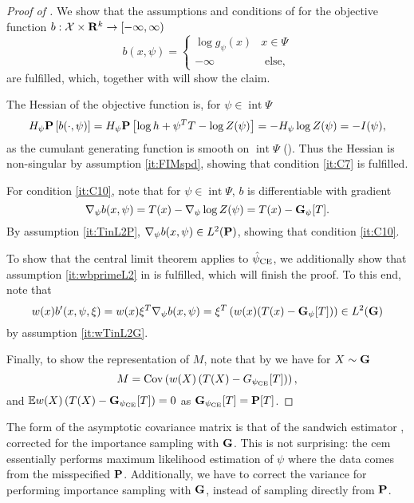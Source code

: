 \begin{proof}[Proof of ]
    We show that the assumptions and conditions of  for the objective function $b : \mathcal X \times \R^{k} \to [-\infty, \infty)$ 
    $$
        b(x,\psi) = \begin{cases}
            \log g_{\psi}(x) & x\in\Psi\\
            - \infty & \text{ else,}
        \end{cases}
    $$
    are fulfilled, which, together with  will show the claim. 

    The Hessian of the objective function is, for $\psi \in \operatorname{int} \Psi$
    $$
        H_{\psi} \P \left[ b(\cdot, \psi) \right] = H_{\psi} \P \left[ \log h + \psi^{T} T - \log Z(\psi) \right] = -H_{\psi}\log Z(\psi)  = - I(\psi),
    $$
    as the cumulant generating function is smooth on $ \operatorname{int} \Psi$ (). Thus the Hessian is non-singular by assumption \ref{it:FIMspd}, showing that condition \ref{it:C7} is fulfilled.

    For condition \ref{it:C10}, note that for $\psi \in \operatorname{int} \Psi$, $b$ is differentiable with gradient 
    $$
        \nabla_{\psi} b(x, \psi) = T(x) - \nabla_{\psi} \log Z(\psi) = T(x) - \G_{\psi} [T].
    $$
    By assumption \ref{it:TinL2P}, $\nabla_{\psi} b(x,\psi) \in L^{2} (\P)$, showing that condition \ref{it:C10}.

    To show that the central limit theorem applies to $\hpce$, we additionally show that assumption \ref{it:wbprimeL2} in  is fulfilled, which will finish the proof. To this end, note that 
    $$
        w(x)b'(x,\psi,\xi) = w(x) \xi^{T}\nabla_{\psi} b(x, \psi) = \xi^{T} \left( w(x) (T(x) - \G_{\psi}[T]) \right) \in L^{2} (\G)
    $$
    by assumption \ref{it:wTinL2G}.

    Finally, to show the representation of $M$, note that by  we have for $X \sim \G$
    $$
        M = \cov \left( w(X) \left( T(X) - G_{\pce}[T]\right)\right),
    $$
    and $\E w(X) \left( T(X) - \G_{\pce} [T] \right) = 0$ as $\G_{\pce} [T] = \P [T]$.
\end{proof}

The form of the asymptotic covariance matrix is that of the sandwich estimator \citep{White1982Maximum}, corrected for the importance sampling with $\G$. This is not surprising: the \acrshort{cem} essentially performs maximum likelihood estimation of $\psi$ where the data comes from the misspecified $\P$. Additionally, we have to correct the variance for performing importance sampling with $\G$, instead of sampling directly from $\P$.

